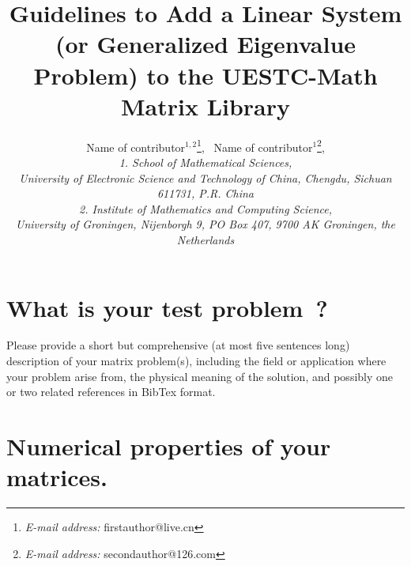 \documentclass[12pt]{article}
\date{}
\begin{document}
%
%
\title{Guidelines to Add a Linear System (or Generalized Eigenvalue Problem) to the 
UESTC-Math Matrix Library}

\author{Name of contributor$^{1,2}$\footnote{\textit{E-mail address:} firstauthor@live.cn},
\mbox{ }Name of contributor$^1$\footnote{\textit{E-mail address:} secondauthor@126.com},
\\
{\footnotesize{\it 1. School of Mathematical Sciences,}}\\
{\footnotesize{\it University of Electronic Science and Technology of China,
Chengdu, Sichuan 611731, P.R. China}}\\
{\footnotesize{\it 2. Institute of Mathematics and Computing Science,}}\\
{\footnotesize{\it University of Groningen, Nijenborgh 9, PO Box 407, 9700 AK
Groningen, the Netherlands}}
}
\maketitle


\section{What is your test problem~?}
Please provide a short but comprehensive (at most five sentences long) description of your matrix problem(s), including the field or application where your problem arise from, the physical meaning of the solution, and possibly one or two related references in BibTex format.


\section{Numerical properties of your matrices.}
\label{sec2}
\end{document}
